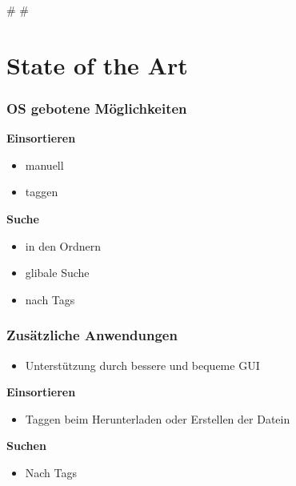
\def\mytitle{FileNetwork: Konzept zur Requirements Analyse}
\def\myauthor{Anastasia Kazakova, Jens Rauch, Marco Brochert}
\def\mydate{5. Mai 2012}
\def\latexmode{beamer}
\def\latexxslt{beamer}
\def\theme{keynote-IntSysTheme}


\# \#

\section{State of the Art}
\label{stateoftheart}

\begin{frame}

\frametitle{OS gebotene Möglichkeiten}
\label{osgebotenemglichkeiten}

\textbf{Einsortieren}

\begin{itemize}
\item manuell

\item taggen

\end{itemize}

\textbf{Suche}

\begin{itemize}
\item in den Ordnern

\item glibale Suche

\item nach Tags

\end{itemize}

\end{frame}

\begin{frame}

\frametitle{Zusätzliche Anwendungen}
\label{zustzlicheanwendungen}

\begin{itemize}
\item Unterstützung durch bessere und bequeme GUI

\end{itemize}

\textbf{Einsortieren}

\begin{itemize}
\item Taggen beim Herunterladen oder Erstellen der Datein

\end{itemize}

\textbf{Suchen}

\begin{itemize}
\item Nach Tags

\end{itemize}

\end{frame}

